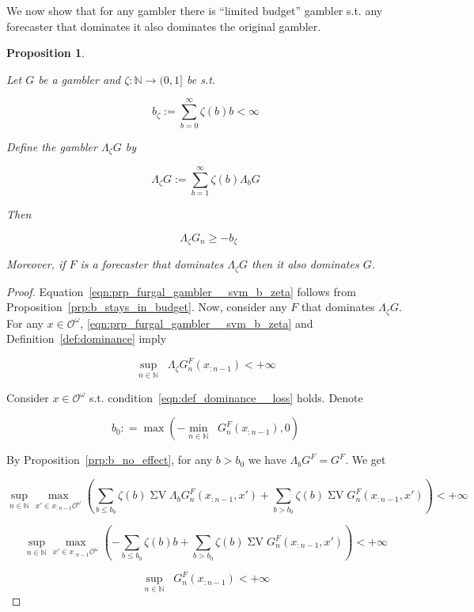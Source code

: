 \documentclass[11pt]{article}
\theoremstyle{definition}
\theoremstyle{plain}
\newtheorem{proposition}{Proposition}%
\newcommand{\Nats}{\mathbb{N}}
\newcommand{\Ob}{\mathcal{O}}
\newcommand{\OO}{\Ob^\omega}
\DeclareMathOperator{\SV}{\Sigma V}
\DeclareMathOperator{\SVM}{\Sigma V_{\min}}
\DeclareMathOperator{\SVX}{\Sigma V_{\max}}
\newcommand{\Bd}{\Lambda}
\begin{document}
We now show that for any gambler there is \enquote{limited budget} gambler s.t. any forecaster that dominates it also dominates the original gambler.

\begin{proposition}
\label{prp:frugal_gambler}

Let $G$ be a gambler and $\zeta: \Nats \rightarrow (0,1]$ be s.t.

\begin{equation}
b_\zeta := \sum_{b=0}^\infty \zeta(b) b < \infty
\end{equation}

Define the gambler $\Bd_\zeta G$ by

\begin{equation}
\Bd_\zeta G := \sum_{b = 1}^\infty \zeta(b) \Bd_b G
\end{equation}

Then

\begin{equation}
\label{eqn:prp_furgal_gambler__svm_b_zeta}
\SVM \Bd_\zeta G_n \geq -b_\zeta
\end{equation}

Moreover, if $F$ is a forecaster that dominates $\Bd_\zeta G$ then it also dominates $G$.

\end{proposition}

\begin{proof}

Equation~\ref{eqn:prp_furgal_gambler__svm_b_zeta} follows from Proposition~\ref{prp:b_stays_in_budget}. Now, consider any $F$ that dominates $\Bd_\zeta G$. For any $x \in \OO$, \ref{eqn:prp_furgal_gambler__svm_b_zeta} and Definition~\ref{def:dominance} imply

\[\sup_{n \in \Nats} {\SVX \Bd_\zeta G^F_{n}(x_{:n-1})} < +\infty\]

Consider $x \in \OO$ s.t. condition~\ref{eqn:def_dominance__loss} holds. Denote

\[b_0: = \max( -\min_{n \in \Nats} {\SVM G^F_{n}(x_{:n-1})},0)\]

By Proposition~\ref{prp:b_no_effect}, for any $b > b_0$ we have $\Bd_b G^F = G^F$. We get

\[\sup_{n \in \Nats} \max_{x' \in x_{:n-1}\OO} (\sum_{b \leq b_0} \zeta(b) {\SV \Bd_b G^F_{n}(x_{:n-1},x')} + \sum_{b > b_0} \zeta(b) \SV G^F_{n}(x_{:n-1},x')) < +\infty\]

\[\sup_{n \in \Nats} \max_{x' \in x_{:n-1}\OO} (-\sum_{b \leq b_0} \zeta(b) b + \sum_{b > b_0} \zeta(b) \SV G^F_{n}(x_{:n-1},x')) < +\infty\]

\[\sup_{n \in \Nats} \SVX G^F_{n}(x_{:n-1}) < +\infty\]
\end{proof}
\end{document}
